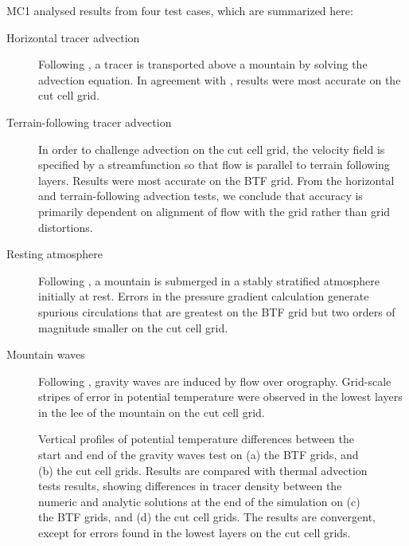 \documentclass[a4paper]{article}
\begin{document}
MC1 analysed results from four test cases, which are summarized here:
\begin{description}
	\item[Horizontal tracer advection]{Following \citet{schaer2002}, a tracer is transported above a mountain by solving the advection equation.  In agreement with \citet{good2014}, results were most accurate on the cut cell grid.}
	\item[Terrain-following tracer advection]{In order to challenge advection on the cut cell grid, the velocity field is specified by a streamfunction so that flow is parallel to terrain following layers.  Results were most accurate on the BTF grid.  From the horizontal and terrain-following advection tests, we conclude that accuracy is primarily dependent on alignment of flow with the grid rather than grid distortions.}
	\item[Resting atmosphere]{Following \citet{klemp2011}, a mountain is submerged in a stably stratified atmosphere initially at rest.  Errors in the pressure gradient calculation generate spurious circulations that are greatest on the BTF grid but two orders of magnitude smaller on the cut cell grid.}
	\item[Mountain waves]{Following \citet{schaer2002}, gravity waves are induced by flow over orography.  Grid-scale stripes of error in potential temperature were observed in the lowest layers in the lee of the mountain on the cut cell grid.}
\end{description}

\begin{figure}
	\centering
	\footnotesize
	
%
	\caption{Vertical profiles of potential temperature differences between the start and end of the gravity waves test on (a) the BTF grids, and (b) the cut cell grids.  Results are compared with thermal advection tests results, showing differences in tracer density between the numeric and analytic solutions at the end of the simulation on (c) the BTF grids, and (d) the cut cell grids.  The results are convergent, except for errors found in the lowest layers on the cut cell grids.}
	\label{fig:sampleLines}
\end{figure}
\end{document}

